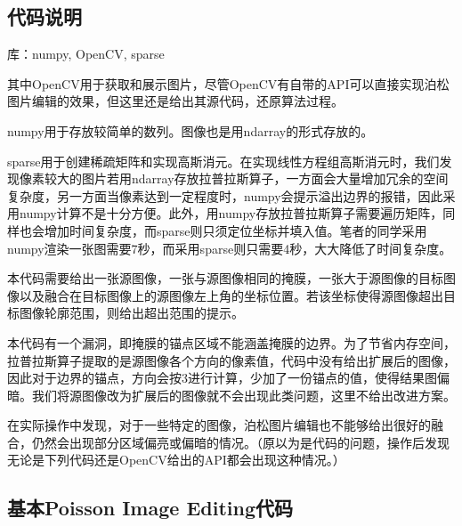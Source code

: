 \documentclass[12pt, a4paper, oneside]{report}
\begin{document}
	\subsection{代码说明}
	\noindent 库：numpy, OpenCV, sparse
	
	其中OpenCV用于获取和展示图片，尽管OpenCV有自带的API可以直接实现泊松图片编辑的效果，但这里还是给出其源代码，还原算法过程。
	
	numpy用于存放较简单的数列。图像也是用ndarray的形式存放的。
	
	sparse用于创建稀疏矩阵和实现高斯消元。在实现线性方程组高斯消元时，我们发现像素较大的图片若用ndarray存放拉普拉斯算子，一方面会大量增加冗余的空间复杂度，另一方面当像素达到一定程度时，numpy会提示溢出边界的报错，因此采用numpy计算不是十分方便。此外，用numpy存放拉普拉斯算子需要遍历矩阵，同样也会增加时间复杂度，而sparse则只须定位坐标并填入值。笔者的同学采用numpy渲染一张图需要7秒，而采用sparse则只需要4秒，大大降低了时间复杂度。
	
	本代码需要给出一张源图像，一张与源图像相同的掩膜，一张大于源图像的目标图像以及融合在目标图像上的源图像左上角的坐标位置。若该坐标使得源图像超出目标图像轮廓范围，则给出超出范围的提示。
	
	本代码有一个漏洞，即掩膜的锚点区域不能涵盖掩膜的边界。为了节省内存空间，拉普拉斯算子提取的是源图像各个方向的像素值，代码中没有给出扩展后的图像，因此对于边界的锚点，方向会按3进行计算，少加了一份锚点的值，使得结果图偏暗。我们将源图像改为扩展后的图像就不会出现此类问题，这里不给出改进方案。
	
	在实际操作中发现，对于一些特定的图像，泊松图片编辑也不能够给出很好的融合，仍然会出现部分区域偏亮或偏暗的情况。（原以为是代码的问题，操作后发现无论是下列代码还是OpenCV给出的API都会出现这种情况。）
	
	\subsection{基本Poisson Image Editing代码}
	
\end{document}

